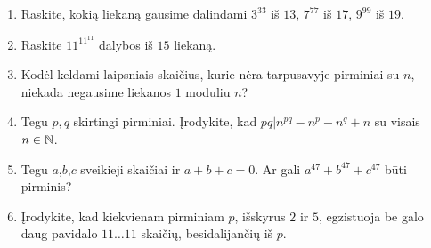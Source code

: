 \begin{enumerate}
  \item Raskite, kokią liekaną gausime dalindami $3^{33}$  iš $13$, $7^{77}$
    iš $17$, $9^{99}$ iš $19$. 
  \item Raskite $11^{11^{11}}$ dalybos iš $15$ liekaną. 
  \item Kodėl keldami laipsniais skaičius, kurie nėra tarpusavyje pirminiai su
    $n$, niekada negausime liekanos $1$ moduliu $n$?
 \item Tegu $p,q$ skirtingi pirminiai. Įrodykite, kad $pq|n^{pq} - n^{p} -
    n^{q} + n$ su visais $n\in \mathbb N$.
  \item Tegu $a$,$b$,$c$ sveikieji skaičiai ir $a+b+c=0$. Ar gali
    $a^{47}+b^{47}+c^{47}$ būti pirminis?
  \item Įrodykite, kad kiekvienam pirminiam $p$, išskyrus $2$ ir $5$,
    egzistuoja be galo daug pavidalo $11\dots11$ skaičių, besidalijančių iš
    $p$.

\end{enumerate}
